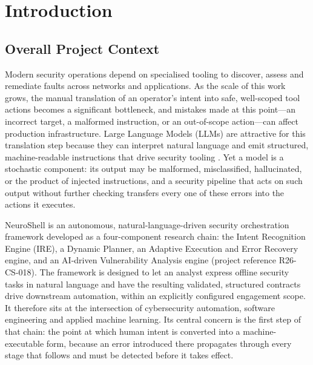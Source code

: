 \chapter{Introduction}\label{ch:introduction}

\section{Overall Project Context}\label{sec:overall-project-context}

Modern security operations depend on specialised tooling to discover, assess and
remediate faults across networks and applications. As the scale of this work
grows, the manual translation of an operator's intent into safe, well-scoped tool
actions becomes a significant bottleneck, and mistakes made at this point---an
incorrect target, a malformed instruction, or an out-of-scope action---can affect
production infrastructure. Large Language Models (LLMs) are attractive for this
translation step because they can interpret natural language and emit structured,
machine-readable instructions that drive security tooling
\parencite{deng2024pentestgpt}. Yet a model is a stochastic component: its output
may be malformed, misclassified, hallucinated, or the product of injected
instructions, and a security pipeline that acts on such output without further
checking transfers every one of these errors into the actions it executes.

NeuroShell is an autonomous, natural-language-driven security orchestration
framework developed as a four-component research chain: the Intent Recognition
Engine (IRE), a Dynamic Planner, an Adaptive Execution and Error Recovery engine,
and an AI-driven Vulnerability Analysis engine (project reference R26-CS-018).
The framework is designed to let an analyst express offline security tasks in
natural language and have the resulting validated, structured contracts drive
downstream automation, within an explicitly configured engagement scope. It
therefore sits at the intersection of cybersecurity automation, software
engineering and applied machine learning. Its central concern is the first step
of that chain: the point at which human intent is converted into a
machine-executable form, because an error introduced there propagates through
every stage that follows and must be detected before it takes effect.

